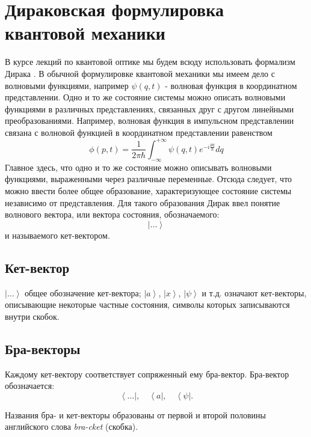 \section{Дираковская  формулировка  квантовой  механики}
\label{AddDirac}
В курсе лекций по квантовой оптике мы будем всюду использовать формализм
Дирака \cite{bDiracPrincipleQuantumMechanic}. В обычной формулировке квантовой
механики мы имеем дело с волновыми функциями, например $\psi\left(q,
t\right)$ - волновая функция в 
координатном представлении. Одно и то же состояние системы можно
описать волновыми функциями в различных представлениях, связанных друг
с другом линейными преобразованиями. Например, волновая функция в
импульсном представлении связана с волновой функцией в координатном
представлении равенством 
\begin{equation}
\phi\left(p, t\right) = \frac{1}{2 \pi \hbar} \int_{-\infty}^{+\infty}
\psi \left(q, t\right) e^{-i \frac{p q}{\hbar}} dq
\end{equation}
Главное здесь, что одно и то же состояние можно описывать волновыми
функциями, выраженными через различные переменные. Отсюда следует, что
можно ввести более общее образование, характеризующее состояние
системы независимо от представления. Для такого образования Дирак ввел
понятие волнового вектора, или вектора состояния, обозначаемого: 
\begin{equation}
\left| \dots \right>
\end{equation}
и называемого кет-вектором.

\subsection{Кет-вектор}
$\left| \dots \right>$ общее обозначение кет-вектора;  $\left| a
\right>$,  $\left| x \right>$, $\left| \psi \right>$ и т.д. означают
кет-векторы, описывающие некоторые частные состояния, символы которых
записываются внутри скобок. 

\subsection{Бра-векторы}
Каждому кет-вектору соответствует сопряженный ему
бра-вектор. Бра-вектор обозначается: 
\begin{equation}
\left< \dots \right|, \quad 
\left< a \right|, \quad  
\left< \psi \right|.
\end{equation}

Названия бра- и кет-векторы образованы от первой и второй половины
английского слова  {\itshape bra-cket}  (скобка).


